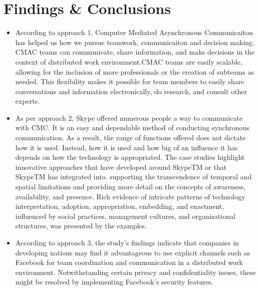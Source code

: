 \documentclass[runningheads]{llncs}
\begin{document}
\section{Findings \& Conclusions}

\begin{itemize}
    \item According to approach 1, Computer Mediated Asynchronous Communicaiton has helped us how we pursue teamwork, communicaiton and decision making. CMAC teams can communicate, share information, and make decisions in the context of distributed work environment.CMAC teams are easily scalable, allowing for the inclusion of more professionals or the creation of subteams as needed. This flexibility makes it possible for team members to easily share conversations and information electronically, do research, and consult other experts. ~\cite{refpaper5}\\
    \item As per approach 2, Skype offered numerous people a way to communicate with CMC. It is an easy and dependable method of conducting synchronous communication. As a result, the range of functions offered does not dictate how it is used. Instead, how it is used and how big of an influence it has depends on how the technology is appropriated. The case studies highlight innovative approaches that have developed around SkypeTM or that SkypeTM has integrated into. supporting the transcendence of temporal and spatial limitations and providing more detail on the concepts of awareness, availability, and presence. Rich evidence of intricate patterns of technology interpretation, adoption, appropriation, embedding, and enactment, influenced by social practices, management cultures, and organizational structures, was presented by the examples. ~\cite{refpaper7}\\
    \item According to approach 3, the study's findings indicate that companies in developing nations may find it advantageous to use explicit channels such as Facebook for team coordination and communication in a distributed work environment. Notwithstanding certain privacy and confidentiality issues, these might be resolved by implementing Facebook's security features. ~\cite{refpaper8}
\end{itemize}
\end{document}
